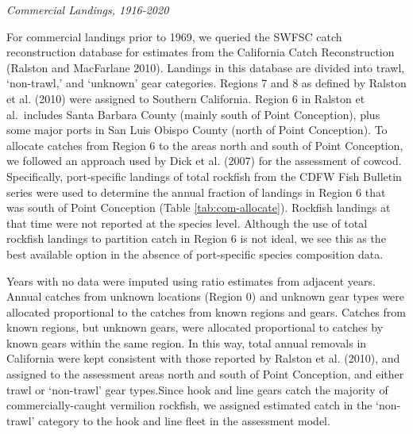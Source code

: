 \documentclass[11pt,
  english,
  a4paper,
]{article}
\begin{document}
\emph{Commercial Landings, 1916-2020}

For commercial landings prior to 1969, we queried the SWFSC catch reconstruction database for estimates from the California Catch Reconstruction {(Ralston and MacFarlane 2010)\leavevmode\tagmcend\tagstructend}. Landings in this database are divided into trawl, `non-trawl,' and `unknown' gear categories. Regions 7 and 8 as defined by Ralston et al. {(2010)\leavevmode\tagmcend\tagstructend} were assigned to Southern California. Region 6 in Ralston et al.~includes Santa Barbara County (mainly south of Point Conception), plus some major ports in San Luis Obispo County (north of Point Conception). To allocate catches from Region 6 to the areas north and south of Point Conception, we followed an approach used by Dick et al. {(2007)\leavevmode\tagmcend\tagstructend} for the assessment of cowcod. Specifically, port-specific landings of total rockfish from the CDFW Fish Bulletin series were used to determine the annual fraction of landings in Region 6 that was south of Point Conception (Table \ref{tab:com-allocate}). Rockfish landings at that time were not reported at the species level. Although the use of total rockfish landings to partition catch in Region 6 is not ideal, we see this as the best available option in the absence of port-specific species composition data.

Years with no data were imputed using ratio estimates from adjacent years. Annual catches from unknown locations (Region 0) and unknown gear types were allocated proportional to the catches from known regions and gears. Catches from known regions, but unknown gears, were allocated proportional to catches by known gears within the same region. In this way, total annual removals in California were kept consistent with those reported by Ralston et al. {(2010)\leavevmode\tagmcend\tagstructend}, and assigned to the assessment areas north and south of Point Conception, and either trawl or `non-trawl' gear types.Since hook and line gears catch the majority of commercially-caught vermilion rockfish, we assigned estimated catch in the `non-trawl' category to the hook and line fleet in the assessment model.
\end{document}
